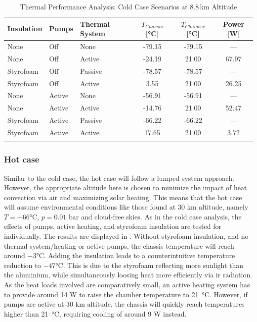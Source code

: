 \begin{table}[H]
\centering
\caption{Thermal Performance Analysis: Cold Case Scenarios at 8.8\,km Altitude}
\label{tab:thermal results cold case}
\begin{tabular}{@{}lll S[table-format=-2.2] S[table-format=-2.2] S[table-format=-2.2]@{}}
\toprule
\textbf{Insulation} & \textbf{Pumps} & \textbf{Thermal System} & {$T_{Chassis}$ [\si{\celsius}]} & {$T_{Chamber}$ [\si{\celsius}]} & {Power [\si{W}]} \\ \midrule
None & Off & None & -79.15 & -79.15 & {---} \\
None & Off & Active & -24.19 & 21.00 & 67.97 \\ 
Styrofoam & Off & Passive & -78.57 & -78.57 & {---} \\
Styrofoam & Off & Active & 3.55 & 21.00 & 26.25 \\ \midrule
None & Active & None & -56.91 & -56.91 & {---} \\
None & Active & Active & -14.76 & 21.00 & 52.47 \\ 
Styrofoam & Active & Passive & -66.22 & -66.22 & {---} \\
Styrofoam & Active & Active & 17.65 & 21.00 & 3.72 \\ \bottomrule
\addlinespace
{}
\end{tabular}
\end{table}

\subsubsection{Hot case}\label{sec: thermal hot case}
Similar to the cold case, the hot case will follow a lumped system approach. However, the appropriate altitude here is chosen to minimize the impact of heat convection via air and maximizing solar heating. This means that the hot case will assume environmental conditions like those found at 30 km altitude, namely $T=-66$°C, $p=0.01$ bar and cloud-free skies. As in the cold case analysis, the effects of pumps, active heating, and styrofoam insulation are tested for individually. The results are displayed in . Without styrofoam insulation, and no thermal system/heating or active pumps, the chassis temperature will reach around $-3$°C. 
Adding the insulation leads to a counterintuitive temperature reduction to $-47$°C. This is due to the styrofoam reflecting more sunlight than the aluminium, while simultaneously loosing heat more efficiently via \gls{ir} radiation. 
As the heat loads involved are comparatively small, an active heating system has to provide around 14 W to raise the chamber temperature to 21 °C. However, if pumps are active at 30 km altitude, the chassis will quickly reach temperatures higher than 21 °C, requiring cooling of around 9 W instead.\par 

